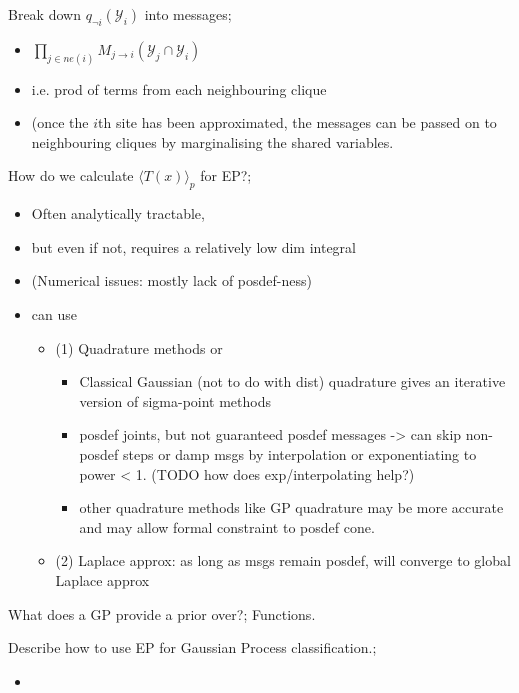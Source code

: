 \documentclass{article}
\begin{document}
Break down $q_{\neg i}(\mathcal{Y}_i)$ into messages; \begin{itemize}
    \item $\prod_{j\in ne(i)}M_{j\rightarrow i}(\mathcal{Y}_j \cap \mathcal{Y}_i)$
    \item i.e. prod of terms from each neighbouring clique
    \item (once the $i$th site has been approximated, the messages can be passed on to neighbouring cliques by marginalising the shared variables.
\end{itemize}




How do we calculate $\langle T(x) \rangle_p$ for EP?; \begin{itemize}
    \item Often analytically tractable, 
    \item but even if not, requires a relatively low dim integral 
    \item (Numerical issues: mostly lack of posdef-ness)
    \item can use \begin{itemize}
        \item (1) Quadrature methods or 
        \begin{itemize}
            \item Classical Gaussian (not to do with dist) quadrature gives an iterative version of sigma-point methods
            \item posdef joints, but not guaranteed posdef messages -> can skip non-posdef steps or damp msgs by interpolation or exponentiating to power < 1. (TODO how does exp/interpolating help?)
            \item other quadrature methods like GP quadrature may be more accurate and  may allow formal constraint to posdef cone.
        \end{itemize}
        \item (2) Laplace approx: as long as msgs remain posdef, will converge to global Laplace approx
    \end{itemize}
\end{itemize}

What does a GP provide a prior over?; Functions.

Describe how to use EP for Gaussian Process classification.; \begin{itemize}
    \item 
\end{itemize}


\end{document}
